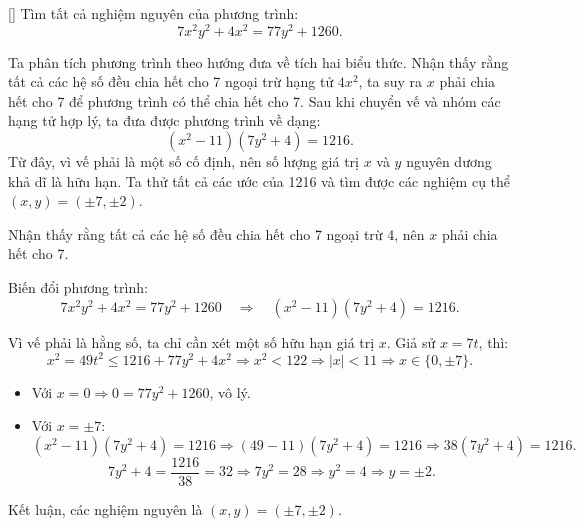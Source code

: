 \documentclass[../04-diophantine-equations.tex]{subfiles}
\begin{document}
\begin{example*}\label{example:CAN-2015-QRC-P1}[\textbf{}]
	Tìm tất cả nghiệm nguyên của phương trình:
	\[
		7x^2y^2 + 4x^2 = 77y^2 + 1260.
	\]	
\end{example*}

\begin{story*}
    Ta phân tích phương trình theo hướng đưa về tích hai biểu thức. Nhận thấy rằng tất cả các hệ số đều chia hết cho 7 ngoại trừ hạng tử \(4x^2\), ta suy ra \(x\) phải chia hết cho 7 để phương trình có thể chia hết cho 7.  
    Sau khi chuyển vế và nhóm các hạng tử hợp lý, ta đưa được phương trình về dạng:
    \[
        (x^2 - 11)(7y^2 + 4) = 1216.
    \]
    Từ đây, vì vế phải là một số cố định, nên số lượng giá trị \(x\) và \(y\) nguyên dương khả dĩ là hữu hạn. Ta thử tất cả các ước của 1216 và tìm được các nghiệm cụ thể \((x, y) = (\pm 7, \pm 2)\).
\end{story*}

\bigbreak

\begin{soln}\footnotemark
	Nhận thấy rằng tất cả các hệ số đều chia hết cho 7 ngoại trừ 4, nên \( x \) phải chia hết cho 7.

	Biến đổi phương trình:
	\[
		7x^2y^2 + 4x^2 = 77y^2 + 1260
		\quad \Rightarrow \quad
		(x^2 - 11)(7y^2 + 4) = 1216.
	\]
	
	Vì vế phải là hằng số, ta chỉ cần xét một số hữu hạn giá trị \( x \). Giả sử \( x = 7t \), thì:
	\[
		x^2 = 49t^2 \leq 1216 + 77y^2 + 4x^2 \Rightarrow x^2 < 122 \Rightarrow |x| < 11 \Rightarrow x \in \{0, \pm7\}.
	\]

	\begin{itemize}[topsep=0pt, partopsep=0pt, itemsep=0pt]
	    \item Với \( x = 0 \Rightarrow 0 = 77y^2 + 1260 \), vô lý.
	    \item Với \( x = \pm7 \):
	    \[
	        (x^2 - 11)(7y^2 + 4) = 1216 \Rightarrow (49 - 11)(7y^2 + 4) = 1216 \Rightarrow 38(7y^2 + 4) = 1216.
	    \]
	    \[
	        7y^2 + 4 = \frac{1216}{38} = 32 \Rightarrow 7y^2 = 28 \Rightarrow y^2 = 4 \Rightarrow y = \pm2.
	    \]
	\end{itemize}

	Kết luận, các nghiệm nguyên là \( (x, y) = (\pm 7, \pm 2) \).
\end{soln}

\end{document}

